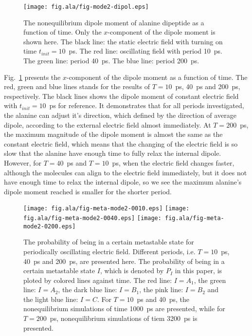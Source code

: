 \documentclass[aip,jcp,a4paper,preprint,onecolumn]{revtex4-1}
\begin{document}
\begin{figure}
  \centering
  \texttt{[image: fig.ala/fig-mode2-dipol.eps]}
  \caption{The nonequilibrium dipole moment of alanine dipeptide as a
    function of time. Only the $x$-component of the dipole moment is
    shown here. The black line: the static electric field with turning on
    time $t_{init} = 10$~ps. The red line: oscillating field with period
    10~ps. The green line: period 40~ps. The blue line: period 200~ps.}
  \label{fig:tmp8}
\end{figure}


Fig.~\ref{fig:tmp8} presents the $x$-component of the dipole moment as
a function of time. The red, green and blue lines stands for the
results of $T=10$~ps, 40~ps and 200~ps, respectively. The black lines
shows the dipole moment of constant electric field with
$t_{init}=10$~ps for reference. It demonstrates that for all periods
investigated, the alanine can adjust it's direction, which defined by
the direction of average dipole, according to the external electric
field almost immediately. At $T=200$~ps, the maximum magnitude of the
dipole moment is almost the same as the constant electric field, which
means that the changing of the electric field is so slow that the
alanine have enough time to fully relax the internal dipole. However,
for $T=40$~ps and $T=10$~ps, when the electric field changes faster,
although the molecules can align to the electric field immediately,
but it does not have enough time to relax the internal dipole, so we
see the maximum alanine's dipole moment reached is smaller for the shorter
period.

\begin{figure}
  \centering
  \texttt{[image: fig.ala/fig-meta-mode2-0010.eps]}
  \texttt{[image: fig.ala/fig-meta-mode2-0040.eps]}
  \texttt{[image: fig.ala/fig-meta-mode2-0200.eps]}
  \caption{ The probability of being in a certain metastable state for
    periodically oscillating electric field. Different periods,
    i.e. $T=10$~ps, 40~ps and 200~ps, are presented here.  The
    probability of being in a certain metastable state $I$, which is
    denoted by $P_I$ in this paper, is ploted by colored lines against
    time. The red line: $I = A_1$, the green line: $I = A_2$, the dark
    blue line: $I = B_1$, the pink line: $I = B_2$ and the light blue
    line: $I = C$. For $T=10$~ps and 40~ps, the nonequilibrium
    simulations of time 1000~ps are presented, while for $T=200$~ps,
    nonequilibrium simulations of tiem 3200~ps is presented.  }
  \label{fig:tmp9}
\end{figure}
\end{document}
